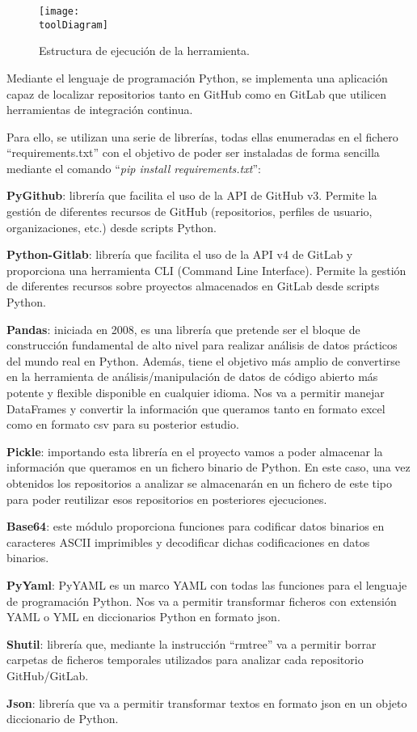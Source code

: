 \begin{figure}[h]
    \centering
    \texttt{[image: \\toolDiagram]}
    \caption{Estructura de ejecución de la herramienta.}
\end{figure}

Mediante el lenguaje de programación Python, se implementa una aplicación capaz de localizar repositorios tanto en GitHub como en GitLab que utilicen herramientas de integración continua.

Para ello, se utilizan una serie de librerías, todas ellas enumeradas en el fichero ``requirements.txt'' con el objetivo de poder ser instaladas de forma sencilla mediante el comando ``\textit{pip install requirements.txt}'':

\begin{compactitem}
    \item \textbf{PyGithub}: librería que facilita el uso de la API de GitHub v3. Permite la gestión de diferentes recursos de GitHub (repositorios, perfiles de usuario, organizaciones, etc.) desde scripts Python.
    \item \textbf{Python-Gitlab}: librería que facilita el uso de la API v4 de GitLab y proporciona una herramienta CLI (Command Line Interface). Permite la gestión de diferentes recursos sobre proyectos almacenados en GitLab desde scripts Python.
    \item \textbf{Pandas}: iniciada en 2008, es una librería que pretende ser el bloque de construcción fundamental de alto nivel para realizar análisis de datos prácticos del mundo real en Python. Además, tiene el objetivo más amplio de convertirse en la herramienta de análisis/manipulación de datos de código abierto más potente y flexible disponible en cualquier idioma. Nos va a permitir manejar DataFrames y convertir la información que queramos tanto en formato excel como en formato csv para su posterior estudio.
    \item \textbf{Pickle}: importando esta librería en el proyecto vamos a poder almacenar la información que queramos en un fichero binario de Python. En este caso, una vez obtenidos los repositorios a analizar se almacenarán en un fichero de este tipo para poder reutilizar esos repositorios en posteriores ejecuciones.
    \item \textbf{Base64}: este módulo proporciona funciones para codificar datos binarios en caracteres ASCII imprimibles y decodificar dichas codificaciones en datos binarios.
    \item \textbf{PyYaml}: PyYAML es un marco YAML con todas las funciones para el lenguaje de programación Python. Nos va a permitir transformar ficheros con extensión YAML o YML en diccionarios Python en formato json.
    \item \textbf{Shutil}: librería que, mediante la instrucción ``rmtree'' va a permitir borrar carpetas de ficheros temporales utilizados para analizar cada repositorio GitHub/GitLab.
    \item \textbf{Json}: librería que va a permitir transformar textos en formato json en un objeto diccionario de Python.
\end{compactitem}

